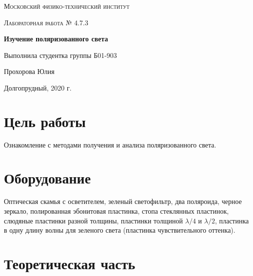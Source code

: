 \documentclass[12pt,a4paper]{article}
\begin{document}
\begin{titlepage}
	\centering
	\vspace{5cm}
	{\scshape\LARGE Московский физико-технический институт \par}

	\vspace{3cm}
	{\scshape\Large Лабораторная работа № 4.7.3 \par}
	\vspace{1cm}
	{\huge\bfseries  Изучение поляризованного света\par}
	\vspace{1cm}
	\vfill
\begin{flushright}
	{\large Выполнила студентка группы Б01-903}\par
	\vspace{0.3cm}
	{\LARGE Прохорова Юлия}
\end{flushright}
	
	\vfill

	Долгопрудный, 2020 г.
\end{titlepage}



\newpage

\tableofcontents

\newpage

\newcommand{\RNumb}[1]{\uppercase\expandafter{\romannumeral #1\relax}}

\pagestyle{fancy} 
\fancyhead{} 
\fancyhead[RE,RO]{\thepage} 


\fancyfoot{}

\section{Цель работы} 

Ознакомление с методами получения и анализа поляризованного света. 
 
 
\section{Оборудование}
Оптическая скамья с осветителем, зеленый светофильтр, два поляроида, черное зеркало, полированная эбонитовая пластинка,
 стопа стеклянных пластинок, слюдяные пластинки разной толщины, пластинки толщиной $\lambda/4$ и $\lambda/2$, пластинка
  в одну длину волны для зеленого света (пластинка чувствительного оттенка).

\section{Теоретическая часть}
\end{document}
